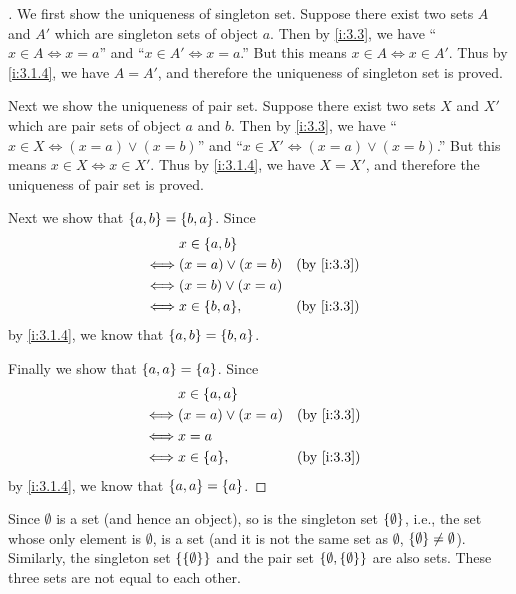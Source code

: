 \begin{proof}[]
  We first show the uniqueness of singleton set.
  Suppose there exist two sets \(A\) and \(A'\) which are singleton sets of object \(a\).
  Then by \cref{i:3.3}, we have ``\(x \in A \iff x = a\)'' and ``\(x \in A' \iff x = a\).''
  But this means \(x \in A \iff x \in A'\).
  Thus by \cref{i:3.1.4}, we have \(A = A'\), and therefore the uniqueness of singleton set is proved.

  Next we show the uniqueness of pair set.
  Suppose there exist two sets \(X\) and \(X'\) which are pair sets of object \(a\) and \(b\).
  Then by \cref{i:3.3}, we have ``\(x \in X \iff (x = a) \lor (x = b)\)'' and ``\(x \in X' \iff (x = a) \lor (x = b)\).''
  But this means \(x \in X \iff x \in X'\).
  Thus by \cref{i:3.1.4}, we have \(X = X'\), and therefore the uniqueness of pair set is proved.

  Next we show that \(\left\lbrace a, b\right\rbrace = \left\lbrace b, a\right\rbrace\).
  Since
  \begin{align*}
         & x \in \set{a, b}                     \\
    \iff & (x = a) \lor (x = b) &  & \by{i:3.3} \\
    \iff & (x = b) \lor (x = a)                 \\
    \iff & x \in \set{b, a},    &  & \by{i:3.3}
  \end{align*}
  by \cref{i:3.1.4}, we know that \(\left\lbrace a, b\right\rbrace = \left\lbrace b, a\right\rbrace\).

  Finally we show that \(\left\lbrace a, a\right\rbrace = \left\lbrace a\right\rbrace\).
  Since
  \begin{align*}
         & x \in \set{a, a}                     \\
    \iff & (x = a) \lor (x = a) &  & \by{i:3.3} \\
    \iff & x = a                                \\
    \iff & x \in \set{a},       &  & \by{i:3.3}
  \end{align*}
  by \cref{i:3.1.4}, we know that \(\left\lbrace a, a\right\rbrace = \left\lbrace a\right\rbrace\).
\end{proof}

\begin{eg}\label{i:3.1.10}
  Since \(\emptyset\) is a set (and hence an object), so is the singleton set \(\left\lbrace\emptyset\right\rbrace\), i.e., the set whose only element is \(\emptyset\), is a set (and it is not the same set as \(\emptyset\), \(\left\lbrace\emptyset\right\rbrace \neq \emptyset\)).
  Similarly, the singleton set \(\left\lbrace\left\lbrace\emptyset\right\rbrace\right\rbrace\) and the pair set \(\left\lbrace\emptyset, \left\lbrace\emptyset\right\rbrace\right\rbrace\) are also sets.
  These three sets are not equal to each other.
\end{eg}

